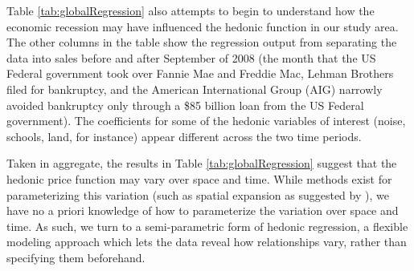 \documentclass{article}\usepackage{graphicx, color}
\begin{document}
Table \ref{tab:globalRegression} also attempts to begin to understand how the economic recession may have influenced the hedonic function in our study area. The other columns in the table show the regression output from separating the data into sales before and after September of 2008 (the month that the US Federal government took over Fannie Mae and Freddie Mac, Lehman Brothers filed for bankruptcy, and the American International Group (AIG) narrowly avoided bankruptcy only through a \$85 billion loan from the US Federal government). The coefficients for some of the hedonic variables of interest (noise, schools, land, for instance) appear different across the two time periods.

Taken in aggregate, the results in Table \ref{tab:globalRegression} suggest that the hedonic price function may vary over space and time. While methods exist for parameterizing this variation (such as spatial expansion as suggested by \citet{Casetti1972}), we have no a priori knowledge of how to parameterize the variation over space and time. As such, we turn to a semi-parametric form of hedonic regression, a flexible modeling approach which lets the data reveal how relationships vary, rather than specifying them beforehand.
\end{document}
